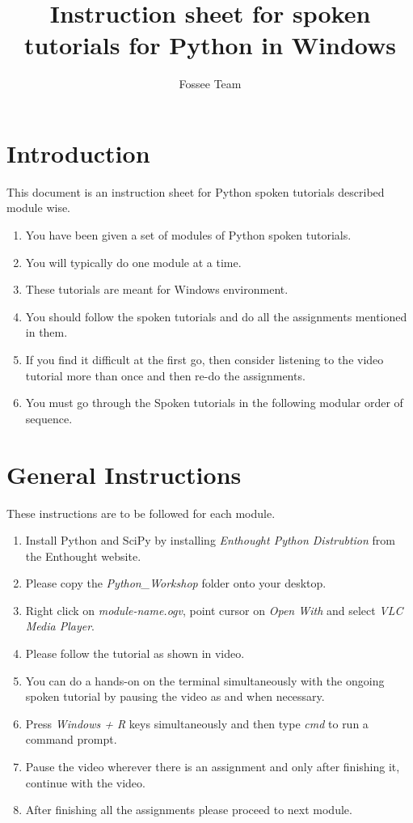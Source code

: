\documentclass[11pt,twocolumn]{article}
\begin{document}
\title{Instruction sheet for spoken tutorials for Python in Windows}
\author{Fossee Team}
\maketitle
\section*{Introduction }
{This document is an instruction sheet for Python spoken tutorials described module wise.}
\setlength{\columnsep}{15pt }
\begin{enumerate}
  \item You have been given a set of modules of Python spoken tutorials.
  \item You will typically do one module at a time.
  \item These tutorials are meant for Windows environment.
  \item You should follow the spoken tutorials and do all the assignments mentioned in them.
   \item If you find it difficult at the first go, then consider listening to the video tutorial more than once and then re-do the assignments.
   \item You must go through the Spoken tutorials in the following modular order of sequence. 

\end{enumerate}

\section*{General Instructions}
{These instructions are to be followed for each module.}
\setlength{\columnsep}{15pt }
\begin{enumerate}
	  
	\item Install Python and SciPy by installing \emph{Enthought Python Distrubtion} from the Enthought website. 
	\item Please copy the \emph{Python\_Workshop} folder onto your desktop.
   
  \item Right click on \emph{module-name.ogv}, point cursor on \emph{Open With} and select \emph{VLC Media Player}.
  \item Please follow the tutorial as shown in video.
  \item You can do a hands-on on the terminal simultaneously with the ongoing spoken tutorial by pausing the video as   and when necessary.
  \item Press \emph{Windows +  R} keys simultaneously and then type \emph{cmd} to run a command prompt.
  \item Pause the video wherever there is an assignment and only after finishing it, continue with the video.
  \item After finishing all the assignments please proceed to next module. 

\end{enumerate}
\end{document}
